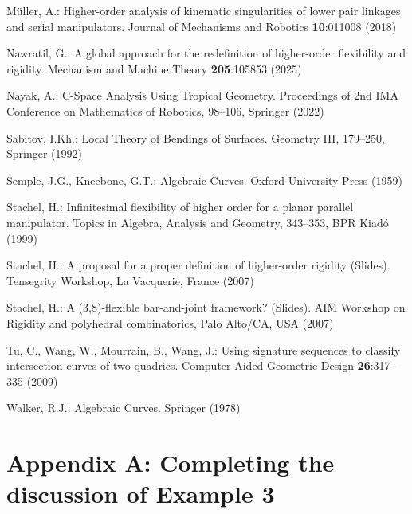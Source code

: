 \documentclass{svproc}
\begin{document}
\begin{thebibliography}{99.}
M\"uller, A.: Higher-order analysis of kinematic singularities of lower pair linkages and serial manipulators. 
Journal of Mechanisms and Robotics \textbf{10}:011008 (2018) 

Nawratil, G.: A global approach for the redefinition of higher-order flexibility and rigidity. Mechanism and Machine Theory \textbf{205}:105853 (2025) 

Nayak, A.:
C-Space Analysis Using Tropical Geometry. Proceedings of 2nd IMA Conference on Mathematics of Robotics,  98--106, Springer (2022) 

Sabitov, I.Kh.: Local Theory of Bendings of Surfaces. 
Geometry III, 179--250, Springer (1992) %

Semple, J.G., Kneebone, G.T.: Algebraic Curves. Oxford University Press (1959)

Stachel, H.: Infinitesimal flexibility of higher order for a planar parallel manipulator. Topics in Algebra, Analysis and Geometry, 
343--353, BPR Kiad\'o (1999) %

Stachel, H.: A proposal for a proper definition of higher-order rigidity (Slides). 
Tensegrity Workshop, La Vacquerie, France (2007)

Stachel, H.: A (3,8)-flexible bar-and-joint framework? (Slides). 
AIM Workshop on Rigidity and polyhedral combinatorics, Palo Alto/CA, USA (2007)

Tu, C., Wang, W., Mourrain, B., Wang, J.: 
Using signature sequences to classify intersection curves of two quadrics. 
Computer Aided Geometric Design 
\textbf{26}:317--335 (2009) 

Walker, R.J.: Algebraic Curves. Springer (1978)

\end{thebibliography}


\newpage



\section*{Appendix A: Completing the discussion of Example 3}
\end{document}
